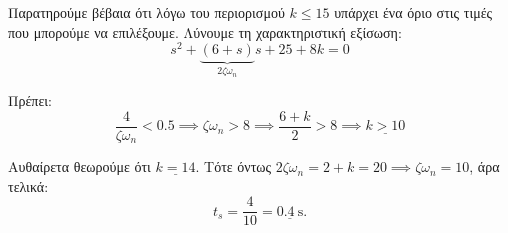 \documentclass[11pt,a4paper,notitlepage,fleqn,final]{article}
\begin{document}
\begin{exercise}
\begin{enumlatin}

Παρατηρούμε βέβαια ότι λόγω του περιορισμού \( k \leq 15 \) υπάρχει ένα όριο στις
τιμές που μπορούμε να επιλέξουμε. Λύνουμε τη χαρακτηριστική εξίσωση:
\[
s^2 + \underbrace{(6+s)}_{2ζ\omega_n}s+25+8k = 0
\]

Πρέπει:
\[
\frac{4}{ζ\omega_n} < 0.5 \implies ζ\omega_n > 8
\implies \frac{6+k}{2} > 8 \implies \underline{k > 10}
\]

Αυθαίρετα θεωρούμε ότι \( \underline{k=14} \). Τότε όντως \( 2ζ\omega_n = 2+k=20 \implies
ζ\omega_n = 10 \), άρα τελικά:
\[
t_s = \frac{4}{10} = \underline{\SI{0.4}{\second}}.
\]

\end{enumlatin}

\hspace{0pt}

\end{exercise}
\end{document}
